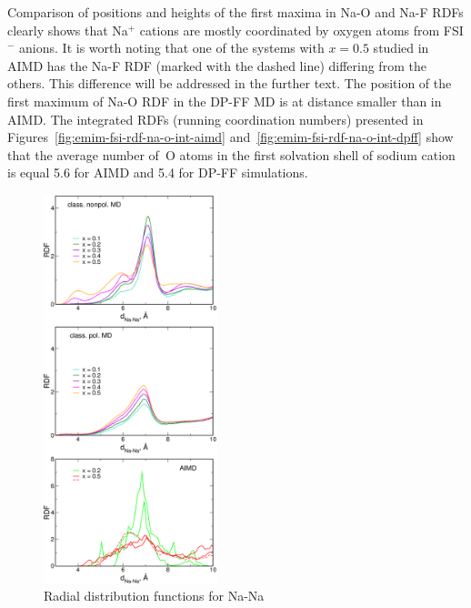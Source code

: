 Comparison of positions and heights of the first maxima in Na-O and Na-F RDFs clearly shows that Na$^{+}$ cations are mostly coordinated by oxygen atoms from FSI$^{-}$ anions. It is worth noting that one of the systems with $x = 0.5$ studied in AIMD has the Na-F RDF (marked with the dashed line) differing from the others. This difference will be addressed in the further text. The position of the first maximum of Na-O RDF in the DP-FF MD is at distance smaller than in AIMD. The integrated RDFs (running coordination numbers) presented in Figures~\ref{fig:emim-fsi-rdf-na-o-int-aimd} and~\ref{fig:emim-fsi-rdf-na-o-int-dpff} show that the average number of~O atoms in the first solvation shell of sodium cation is equal 5.6 for AIMD and 5.4 for DP-FF simulations.

\begin{figure}[ht]
    \centering
    \includegraphics[width=0.45\textwidth]{img/3-structural-data-from-md-simulations/1-emim-fsi/rdf/rdf-na-na.png}
    \caption{Radial distribution functions for Na-Na}
    \label{fig:emim-fsi-rdf-na-na}
\end{figure}

